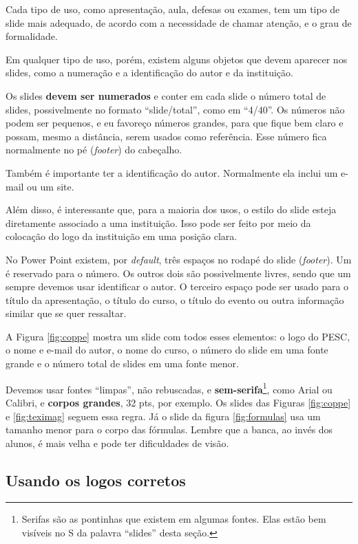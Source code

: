 Cada tipo de uso, como apresentação, aula, defesas ou exames, tem um tipo de slide mais adequado, de acordo com a necessidade de chamar atenção, e o grau de formalidade.

Em qualquer tipo de uso, porém, existem alguns objetos que devem aparecer nos slides, como a numeração e a identificação do autor e da instituição.

Os slides \textbf{devem ser numerados} e conter em cada slide o número total de slides, possivelmente no formato ``slide/total'', como em ``4/40''. Os números não podem ser pequenos, e eu favoreço números grandes, para que fique bem claro e possam, mesmo a distância, serem usados como referência. Esse número fica normalmente no pé (\textit{footer}) do cabeçalho.

Também é importante ter a identificação do autor. Normalmente ela inclui um e-mail ou um site.

Além disso, é interessante que, para a maioria dos usos, o estilo do slide esteja diretamente associado a uma instituição. Isso pode ser feito por meio da colocação do logo da instituição em uma posição clara.

No Power Point existem, por \textit{default}, três espaços no rodapé do slide (\textit{footer}). Um é reservado para o número. Os outros dois são possivelmente livres, sendo que um  sempre devemos usar identificar o autor. O terceiro espaço pode ser usado para o título da apresentação, o título do curso, o título do evento ou outra informação similar que se quer ressaltar.

A Figura \ref{fig:coppe} mostra um slide com todos esses elementos: o logo do PESC, o nome e e-mail do autor, o nome do curso, o número do slide em uma fonte grande e o número total de slides em uma fonte menor.



Devemos usar fontes ``limpas'', não rebuscadas, e \textbf{sem-serifa}\footnote{Serifas são as pontinhas que existem em algumas fontes. Elas estão bem visíveis no S da palavra ``slides'' desta seção.}, como Arial ou Calibri, e \textbf{corpos grandes}, 32 pts, por exemplo. Os slides das Figuras \ref{fig:coppe} e \ref{fig:teximag} seguem essa regra. Já o slide da figura \ref{fig:formulas} usa um tamanho menor para o corpo das fórmulas. Lembre que a banca, ao invés dos alunos, é mais velha e pode ter dificuldades de visão.





\subsection{Usando os logos corretos}

